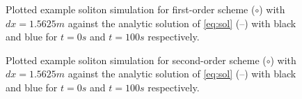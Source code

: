 \documentclass[SingleSpace,12pt]{Serre_ASCE}
\begin{document}
\begin{figure}[htb]
\centering
{}
\caption{Plotted example soliton simulation for first-order scheme ($\circ$) with $dx = 1.5625m$ against the analytic solution of \eqref{eq:sol} (\---) with black and blue for $t =0s$ and $t=100s$ respectively.}
\label{fig:solitoneo1}
\end{figure}
\begin{figure}[htb]
\centering
{}
\caption{Plotted example soliton simulation for second-order scheme ($\circ$) with $dx = 1.5625m$ against the analytic solution of \eqref{eq:sol} (\---) with black and blue for $t =0s$ and $t=100s$ respectively.}
\label{fig:solitoneo2}
\end{figure}
\end{document}
